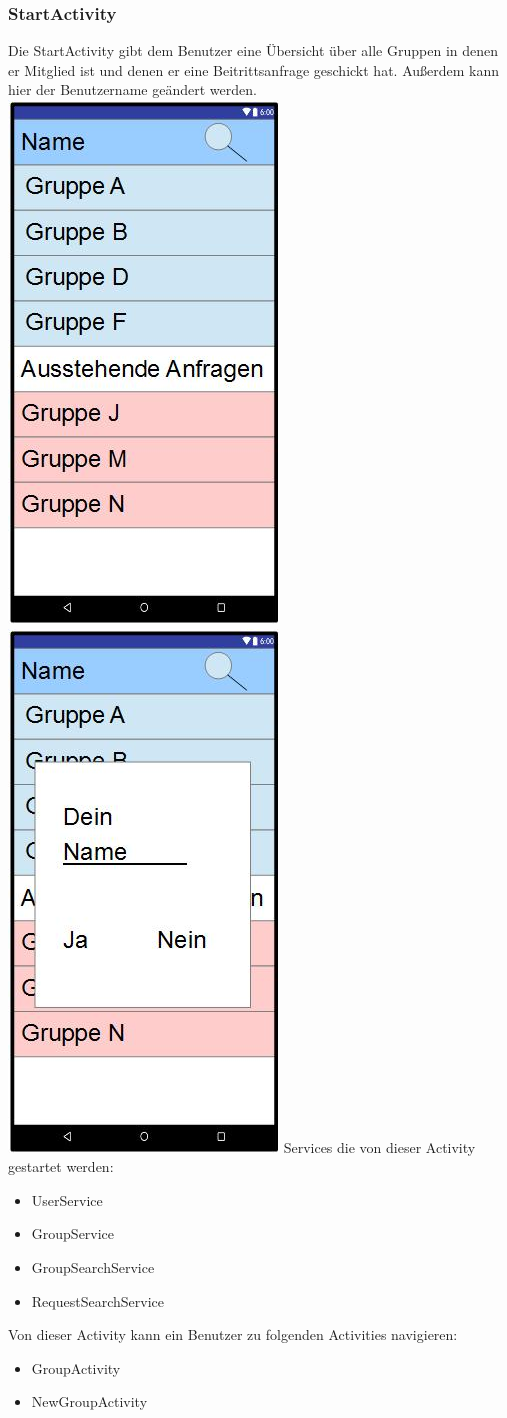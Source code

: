 	\subsubsection {StartActivity}
	Die StartActivity gibt dem Benutzer eine Übersicht über alle Gruppen in denen er Mitglied ist und denen er eine Beitrittsanfrage geschickt hat.
	Außerdem kann hier der Benutzername geändert werden.
	\newline
	\includegraphics[width=.3\textwidth]{GUI_Start.jpg}
	\includegraphics[width=.3\textwidth]{GUI_Start2.jpg}
	\newline
	Services die von dieser Activity gestartet werden:
	\begin{itemize}
	\item UserService
	\item GroupService
	\item GroupSearchService
	\item RequestSearchService
	\end{itemize}
	Von dieser Activity kann ein Benutzer zu folgenden Activities navigieren:
	\begin{itemize} 
	\item GroupActivity
	\item NewGroupActivity
	\end{itemize} 
	
